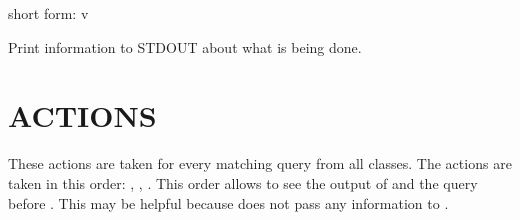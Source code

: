 \documentclass[letterpaper,10pt,english]{sphinxmanual}
\begin{document}

\begin{fulllineitems}
\label{\detokenize{mariadb-kill:cmdoption-mariadb-kill-verbose}}
short form: \sphinxhyphen{}v

Print information to STDOUT about what is being done.

\end{fulllineitems}



\section{ACTIONS}
\label{\detokenize{mariadb-kill:actions}}
These actions are taken for every matching query from all classes.
The actions are taken in this order: {\hyperref[\detokenize{mariadb-kill:cmdoption-mariadb-kill-print}]{}}, {\hyperref[\detokenize{mariadb-kill:cmdoption-mariadb-kill-execute-command}]{}},
.  This order allows {\hyperref[\detokenize{mariadb-kill:cmdoption-mariadb-kill-execute-command}]{}}
to see the output of {\hyperref[\detokenize{mariadb-kill:cmdoption-mariadb-kill-print}]{}} and the query before
.  This may be helpful because  does
not pass any information to {\hyperref[\detokenize{mariadb-kill:cmdoption-mariadb-kill-execute-command}]{}}.
\end{document}

